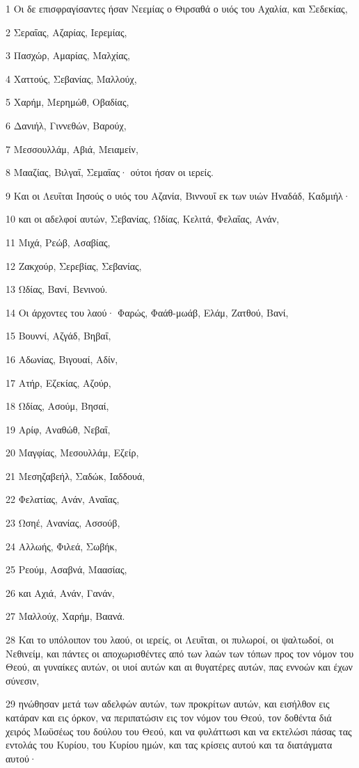 \par 1 Οι δε επισφραγίσαντες ήσαν Νεεμίας ο Θιρσαθά ο υιός του Αχαλία, και Σεδεκίας,
\par 2 Σεραΐας, Αζαρίας, Ιερεμίας,
\par 3 Πασχώρ, Αμαρίας, Μαλχίας,
\par 4 Χαττούς, Σεβανίας, Μαλλούχ,
\par 5 Χαρήμ, Μερημώθ, Οβαδίας,
\par 6 Δανιήλ, Γιννεθών, Βαρούχ,
\par 7 Μεσσουλλάμ, Αβιά, Μειαμείν,
\par 8 Μααζίας, Βιλγαΐ, Σεμαΐας· ούτοι ήσαν οι ιερείς.
\par 9 Και οι Λευΐται Ιησούς ο υιός του Αζανία, Βιννουΐ εκ των υιών Ηναδάδ, Καδμιήλ·
\par 10 και οι αδελφοί αυτών, Σεβανίας, Ωδίας, Κελιτά, Φελαΐας, Ανάν,
\par 11 Μιχά, Ρεώβ, Ασαβίας,
\par 12 Ζακχούρ, Σερεβίας, Σεβανίας,
\par 13 Ωδίας, Βανί, Βενινού.
\par 14 Οι άρχοντες του λαού· Φαρώς, Φαάθ-μωάβ, Ελάμ, Ζατθού, Βανί,
\par 15 Βουννί, Αζγάδ, Βηβαΐ,
\par 16 Αδωνίας, Βιγουαί, Αδίν,
\par 17 Ατήρ, Εζεκίας, Αζούρ,
\par 18 Ωδίας, Ασούμ, Βησαί,
\par 19 Αρίφ, Αναθώθ, Νεβαΐ,
\par 20 Μαγφίας, Μεσουλλάμ, Εζείρ,
\par 21 Μεσηζαβεήλ, Σαδώκ, Ιαδδουά,
\par 22 Φελατίας, Ανάν, Αναΐας,
\par 23 Ωσηέ, Ανανίας, Ασσούβ,
\par 24 Αλλωής, Φιλεά, Σωβήκ,
\par 25 Ρεούμ, Ασαβνά, Μαασίας,
\par 26 και Αχιά, Ανάν, Γανάν,
\par 27 Μαλλούχ, Χαρήμ, Βαανά.
\par 28 Και το υπόλοιπον του λαού, οι ιερείς, οι Λευΐται, οι πυλωροί, οι ψαλτωδοί, οι Νεθινείμ, και πάντες οι αποχωρισθέντες από των λαών των τόπων προς τον νόμον του Θεού, αι γυναίκες αυτών, οι υιοί αυτών και αι θυγατέρες αυτών, πας εννοών και έχων σύνεσιν,
\par 29 ηνώθησαν μετά των αδελφών αυτών, των προκρίτων αυτών, και εισήλθον εις κατάραν και εις όρκον, να περιπατώσιν εις τον νόμον του Θεού, τον δοθέντα διά χειρός Μωϋσέως του δούλου του Θεού, και να φυλάττωσι και να εκτελώσι πάσας τας εντολάς του Κυρίου, του Κυρίου ημών, και τας κρίσεις αυτού και τα διατάγματα αυτού·
